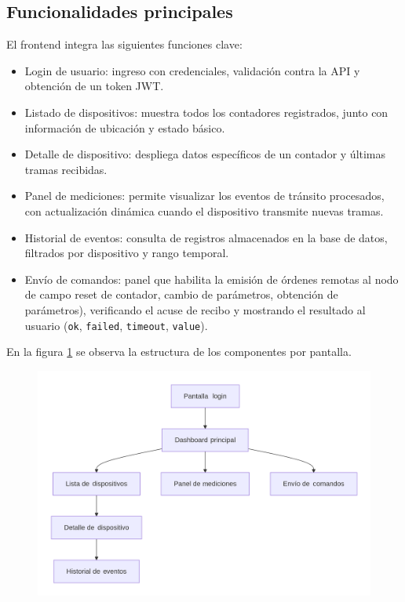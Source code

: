 \subsection{Funcionalidades principales}

El frontend integra las siguientes funciones clave:
\begin{itemize}
    \item Login de usuario: ingreso con credenciales, validación contra la API y obtención de un token JWT.
    \item Listado de dispositivos: muestra todos los contadores registrados, junto con información de ubicación y estado básico.
    \item Detalle de dispositivo: despliega datos específicos de un contador y últimas tramas recibidas.
    \item Panel de mediciones: permite visualizar los eventos de tránsito procesados, con actualización dinámica cuando el dispositivo transmite nuevas tramas.
    \item Historial de eventos: consulta de registros almacenados en la base de datos, filtrados por dispositivo y rango temporal.
    \item Envío de comandos: panel que habilita la emisión de órdenes remotas al nodo de campo  reset de contador, cambio de parámetros, obtención de parámetros), verificando el acuse de recibo y mostrando el resultado al usuario (\texttt{ok}, \texttt{failed}, \texttt{timeout}, \texttt{value}).
\end{itemize}

En la figura \ref{fig:diagrama_controladores} se observa la estructura de los componentes por pantalla.

\begin{figure}[H]
 
  \centering
  \includegraphics[width=1\linewidth]{./Figures/diagEstructuraComponentesPantallasFrontend.png}
  \label{fig:diagrama_controladores}
\end{figure}




